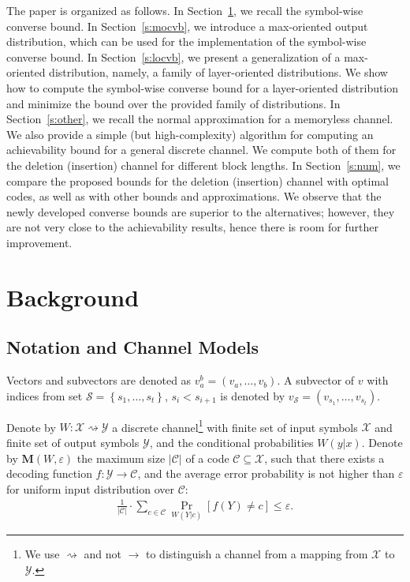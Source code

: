 \documentclass[journal, twocol]{IEEEtran}
\newcommand{\mC}{{\mathcal{C}}}
\newcommand{\bfM}{{\mathbf{M}}}
\newcommand{\mS}{{\mathcal{S}}}
\newcommand{\mX}{{\mathcal{X}}}
\newcommand{\mY}{{\mathcal{Y}}}
\newcommand{\set}[1]{{\left\{{#1}\right\}}}
\newcommand{\brsq}[1]{{\left[{#1}\right]}}
\newcommand{\ve}{\varepsilon}
\newcommand{\tosq}{\rightsquigarrow}
\begin{document}
The paper is organized as follows. In Section~\ref{s:back}, we recall the symbol-wise converse bound. In Section~\ref{s:mocvb}, we introduce a max-oriented output distribution, which can be used for the implementation of the symbol-wise converse bound. In Section~\ref{s:locvb}, we present a generalization of a max-oriented distribution, namely, a family of layer-oriented distributions.
We show how to compute the symbol-wise converse bound for a layer-oriented distribution and minimize the bound over the provided family of distributions.
In Section~\ref{s:other}, we recall the normal approximation for a memoryless channel.
We also provide a simple (but high-complexity) algorithm for computing an achievability bound for a general discrete channel.
We compute both of them for the deletion (insertion) channel for different block lengths.
In Section~\ref{s:num}, we compare the proposed bounds for the deletion (insertion) channel with optimal codes, as well as with other bounds and approximations. We observe that the newly developed converse bounds are superior to the alternatives; however, they are not very close to the achievability results, hence there is room for further improvement.

\section{Background}
\label{s:back}

\subsection{Notation and Channel Models}
Vectors and subvectors are denoted as $v_a^b=(v_a,\dots,v_b)$.
A subvector of $v$ with indices from set $\mS=\set{s_1,\dots,s_t}$, $s_{i}<s_{i+1}$ is denoted by $v_{\mS}=(v_{s_1}, \dots, v_{s_t})$.

Denote by $W:\mX\tosq\mY$ a discrete channel\footnote{We use $\tosq$ and not $\to$ to distinguish a channel from a mapping from $\mX$ to $\mY$.} with finite set of input symbols $\mX$ and finite set of output symbols $\mY$, and the conditional probabilities $W(y|x)$.
Denote by $\bfM(W, \ve)$ the maximum size $|\mC|$ of a code $\mC\subseteq\mX$, such that there exists a decoding function $f:\mY\to\mC$, and the average error probability is not higher than $\ve$ for uniform input distribution over $\mC$:
\begin{align}
\frac{1}{|\mC|}\cdot \sum_{c\in\mC}\Pr_{W(Y|c)}\brsq{f(Y)\neq c} \leq \ve.
\label{eq:decf}
\end{align}
\end{document}

